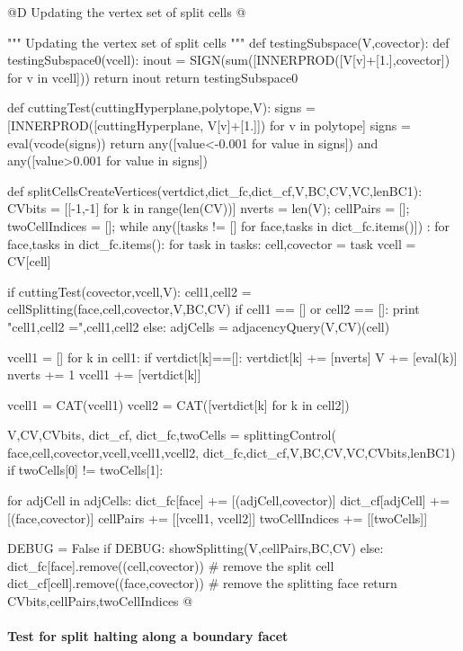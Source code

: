 \documentclass[11pt,oneside]{article}	%
\begin{document}
@D Updating the vertex set  of split cells
@{""" Updating the vertex set of split cells """
def testingSubspace(V,covector):
	def testingSubspace0(vcell):
		inout = SIGN(sum([INNERPROD([V[v]+[1.],covector]) for v in vcell]))
		return inout
	return testingSubspace0
	
def cuttingTest(cuttingHyperplane,polytope,V):
	signs = [INNERPROD([cuttingHyperplane, V[v]+[1.]]) for v in polytope]
	signs = eval(vcode(signs))
	return any([value<-0.001 for value in signs]) and any([value>0.001 for value in signs])

def splitCellsCreateVertices(vertdict,dict_fc,dict_cf,V,BC,CV,VC,lenBC1):
	CVbits = [[-1,-1] for k in range(len(CV))] 
	nverts = len(V); cellPairs = []; twoCellIndices = []; 
	while any([tasks != [] for face,tasks in dict_fc.items()]) : 
		for face,tasks in dict_fc.items():
			for task in tasks:
				cell,covector = task
				vcell = CV[cell]

				if cuttingTest(covector,vcell,V):
					cell1,cell2 = cellSplitting(face,cell,covector,V,BC,CV)
					if cell1 == [] or cell2 == []:
						print "cell1,cell2 =",cell1,cell2
					else:
						adjCells = adjacencyQuery(V,CV)(cell)
												
						vcell1 = []
						for k in cell1:
							if vertdict[k]==[]: 
								vertdict[k] += [nverts]
								V += [eval(k)]
								nverts += 1
							vcell1 += [vertdict[k]]
						
						vcell1 = CAT(vcell1)
						vcell2 = CAT([vertdict[k] for k in cell2])							
															
						V,CV,CVbits, dict_cf, dict_fc,twoCells = splittingControl(
							face,cell,covector,vcell,vcell1,vcell2, dict_fc,dict_cf,V,BC,CV,VC,CVbits,lenBC1)
						if twoCells[0] != twoCells[1]:

							for adjCell in adjCells:
								dict_fc[face] += [(adjCell,covector)] 
								dict_cf[adjCell] += [(face,covector)] 
								cellPairs += [[vcell1, vcell2]]
								twoCellIndices += [[twoCells]]
												
					DEBUG = False
					if DEBUG: showSplitting(V,cellPairs,BC,CV)
				else:
					dict_fc[face].remove((cell,covector))   # remove the split cell
					dict_cf[cell].remove((face,covector))   # remove the splitting face
	return CVbits,cellPairs,twoCellIndices
@}


\paragraph{Test for split halting along a boundary facet}
\end{document}
